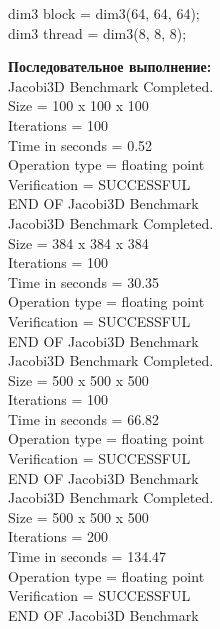 \documentclass[a4paper,12pt,titlepage,draft]{article}
\begin{document}
\newpage
\begin{center}
    dim3 block = dim3(64, 64, 64);\\
    dim3 thread = dim3(8, 8, 8);\\
\end{center}
\begin{minipage}{.5\textwidth}
\textbf{Последовательное выполнение:}\\

 Jacobi3D Benchmark Completed.\\
 Size            =  100 x  100 x  100\\
 Iterations      =                100\\
 Time in seconds =               0.52\\
 Operation type  =     floating point\\
 Verification    =         SUCCESSFUL\\
 END OF Jacobi3D Benchmark\\
 
Jacobi3D Benchmark Completed.\\
Size            =  384 x  384 x  384\\
Iterations      =                100\\
Time in seconds =              30.35\\
Operation type  =     floating point\\
Verification    =         SUCCESSFUL\\
END OF Jacobi3D Benchmark\\

Jacobi3D Benchmark Completed.\\
 Size            =  500 x  500 x  500\\
 Iterations      =                100\\
 Time in seconds =              66.82\\
 Operation type  =     floating point\\
 Verification    =         SUCCESSFUL\\
 END OF Jacobi3D Benchmark\\

Jacobi3D Benchmark Completed.\\
 Size            =  500 x  500 x  500\\
 Iterations      =                200\\
 Time in seconds =             134.47\\
 Operation type  =     floating point\\
 Verification    =         SUCCESSFUL\\
 END OF Jacobi3D Benchmark\\
 
\end{minipage}
\end{document}
